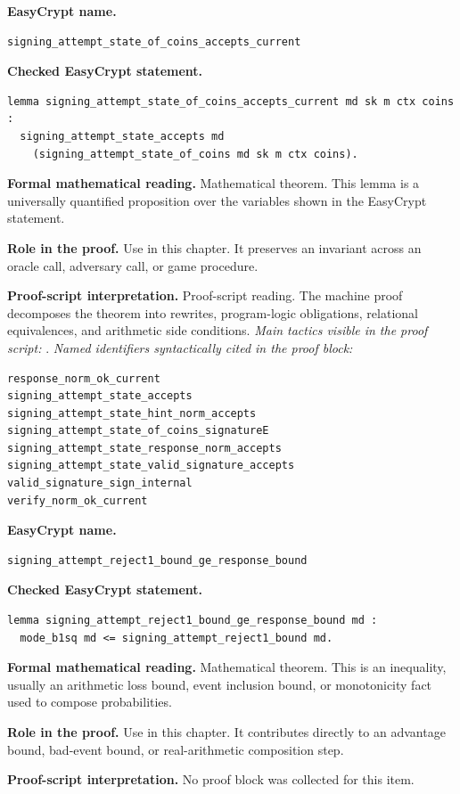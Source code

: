 \begin{formaltheorem}
\noindent\textbf{EasyCrypt name.}
\begin{lstlisting}[language=EasyCrypt,basicstyle=\ttfamily\scriptsize]
signing_attempt_state_of_coins_accepts_current
\end{lstlisting}
\noindent\textbf{Checked EasyCrypt statement.}
\begin{lstlisting}[language=EasyCrypt,basicstyle=\ttfamily\scriptsize]
lemma signing_attempt_state_of_coins_accepts_current md sk m ctx coins :
  signing_attempt_state_accepts md
    (signing_attempt_state_of_coins md sk m ctx coins).
\end{lstlisting}
\noindent\textbf{Formal mathematical reading.}
Mathematical theorem. This lemma is a universally quantified proposition over the variables shown in the EasyCrypt statement.

\noindent\textbf{Role in the proof.}
Use in this chapter. It preserves an invariant across an oracle call, adversary call, or game procedure.

\noindent\textbf{Proof-script interpretation.}
Proof-script reading. The machine proof decomposes the theorem into rewrites, program-logic obligations, relational equivalences, and arithmetic side conditions.
\emph{Main tactics visible in the proof script:} .
\emph{Named identifiers syntactically cited in the proof block:}
\begin{lstlisting}[language=EasyCrypt,basicstyle=\ttfamily\scriptsize]
response_norm_ok_current
signing_attempt_state_accepts
signing_attempt_state_hint_norm_accepts
signing_attempt_state_of_coins_signatureE
signing_attempt_state_response_norm_accepts
signing_attempt_state_valid_signature_accepts
valid_signature_sign_internal
verify_norm_ok_current
\end{lstlisting}

\end{formaltheorem}

\begin{formaltheorem}
\noindent\textbf{EasyCrypt name.}
\begin{lstlisting}[language=EasyCrypt,basicstyle=\ttfamily\scriptsize]
signing_attempt_reject1_bound_ge_response_bound
\end{lstlisting}
\noindent\textbf{Checked EasyCrypt statement.}
\begin{lstlisting}[language=EasyCrypt,basicstyle=\ttfamily\scriptsize]
lemma signing_attempt_reject1_bound_ge_response_bound md :
  mode_b1sq md <= signing_attempt_reject1_bound md.
\end{lstlisting}
\noindent\textbf{Formal mathematical reading.}
Mathematical theorem. This is an inequality, usually an arithmetic loss bound, event inclusion bound, or monotonicity fact used to compose probabilities.

\noindent\textbf{Role in the proof.}
Use in this chapter. It contributes directly to an advantage bound, bad-event bound, or real-arithmetic composition step.

\noindent\textbf{Proof-script interpretation.}
No proof block was collected for this item.

\end{formaltheorem}

